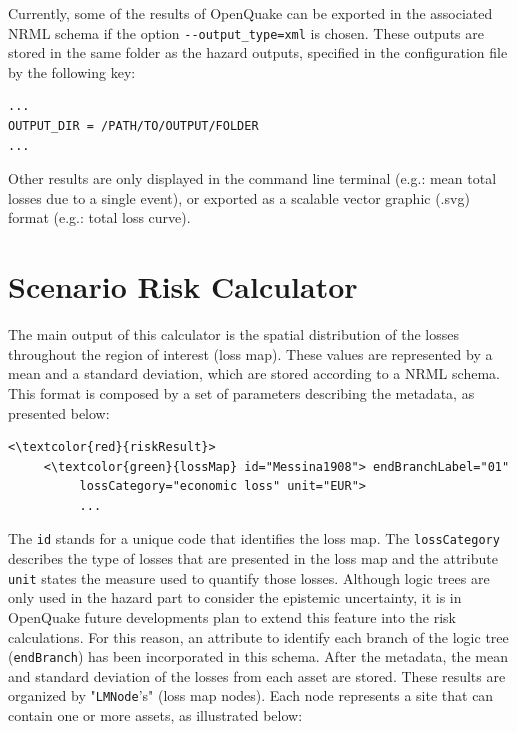 Currently, some of the results of OpenQuake can be exported  in the associated NRML schema if the option \Verb+--output_type=xml+ is chosen. These outputs are stored in the same folder as the hazard outputs, specified in the configuration file by the following key:

\begin{Verbatim}[frame=single, commandchars=\\\{\}, samepage=true]
...
OUTPUT_DIR = /PATH/TO/OUTPUT/FOLDER
...
\end{Verbatim}

Other results are only displayed in the command line terminal (e.g.: mean total losses due to a single event), or exported as a scalable vector graphic (.svg) format (e.g.: total loss curve).

\section{Scenario Risk Calculator}
\label{sec:Scenario}
The main output of this calculator is the spatial distribution of the losses throughout the region of interest (loss map). These values are represented by a mean and a standard deviation, which are stored according to a NRML schema. This format is composed by a set of parameters describing the metadata, as presented below:

\begin{Verbatim}[frame=single, commandchars=\\\{\}, samepage=true]
<\textcolor{red}{riskResult}>
     <\textcolor{green}{lossMap} id="Messina1908"> endBranchLabel="01" 
          lossCategory="economic loss" unit="EUR">
          ...
\end{Verbatim}

The \Verb+id+ stands for a unique code that identifies the loss map. The \Verb+lossCategory+ describes the type of losses that are presented in the loss map and the attribute \Verb+unit+ states the measure used to quantify those losses. Although logic trees are only used in the hazard part to consider the epistemic uncertainty, it is in OpenQuake future developments plan to extend this feature into the risk calculations. For this reason, an attribute to identify each branch of the logic tree (\Verb+endBranch+) has been incorporated in this schema.
After the metadata, the mean and standard deviation of the losses from each asset are stored. These results are organized by  "\Verb+LMNode+'s" (loss map nodes). Each node represents a site that can contain one or more assets, as illustrated below:

